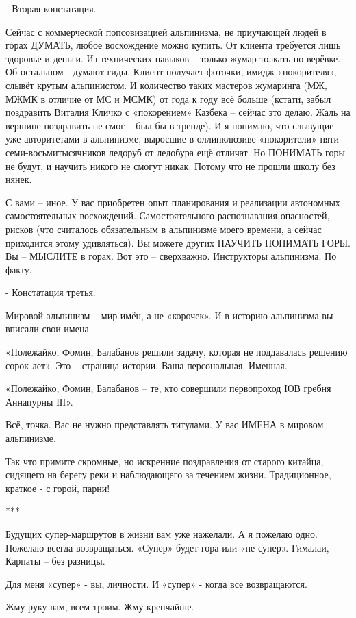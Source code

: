 - Вторая констатация.

Сейчас с коммерческой попсовизацией альпинизма, не приучающей людей в горах
ДУМАТЬ, любое восхождение можно купить. От клиента требуется лишь здоровье и
деньги. Из технических навыков – только жумар толкать по верёвке. Об остальном
- думают гиды. Клиент получает фоточки, имидж «покорителя», слывёт крутым
альпинистом. И количество таких мастеров жумаринга (МЖ, МЖМК в отличие от МС и
МСМК) от года к году всё больше (кстати, забыл поздравить Виталия Кличко с
«покорением» Казбека – сейчас это делаю. Жаль на вершине поздравить не смог –
был бы в тренде). И я понимаю, что слывущие уже авторитетами в альпинизме,
выросшие в оллинклюзиве «покорители» пяти-семи-восьмитысячников ледоруб от
ледобура ещё отличат. Но ПОНИМАТЬ горы не будут, и научить никого не смогут
никак. Потому что не прошли школу без нянек.

С вами – иное. У вас приобретен опыт планирования и реализации автономных
самостоятельных восхождений. Самостоятельного распознавания опасностей, рисков
(что считалось обязательным в альпинизме моего времени, а сейчас приходится
этому удивляться). Вы можете других НАУЧИТЬ ПОНИМАТЬ ГОРЫ. Вы – МЫСЛИТЕ в
горах. Вот это – сверхважно. Инструкторы альпинизма. По факту.

- Констатация третья.

Мировой альпинизм – мир имён, а не «корочек». И в историю альпинизма вы вписали
свои имена.

«Полежайко, Фомин, Балабанов решили задачу, которая не поддавалась решению
сорок лет». Это – страница истории. Ваша персональная. Именная.

«Полежайко, Фомин, Балабанов – те, кто совершили первопроход ЮВ гребня
Аннапурны ІІІ».

Всё, точка. Вас не нужно представлять титулами. У вас ИМЕНА в мировом
альпинизме.

Так что примите скромные, но искренние поздравления от старого китайца,
сидящего на берегу реки и наблюдающего за течением жизни. Традиционное, краткое
- с горой, парни!

***

Будущих супер-маршрутов в жизни вам уже нажелали. А я пожелаю одно. Пожелаю
всегда возвращаться. «Супер» будет гора или «не супер». Гималаи, Карпаты – без
разницы.

Для меня «супер» - вы, личности. И «супер» - когда все возвращаются. 

Жму руку вам, всем троим. Жму крепчайше.
